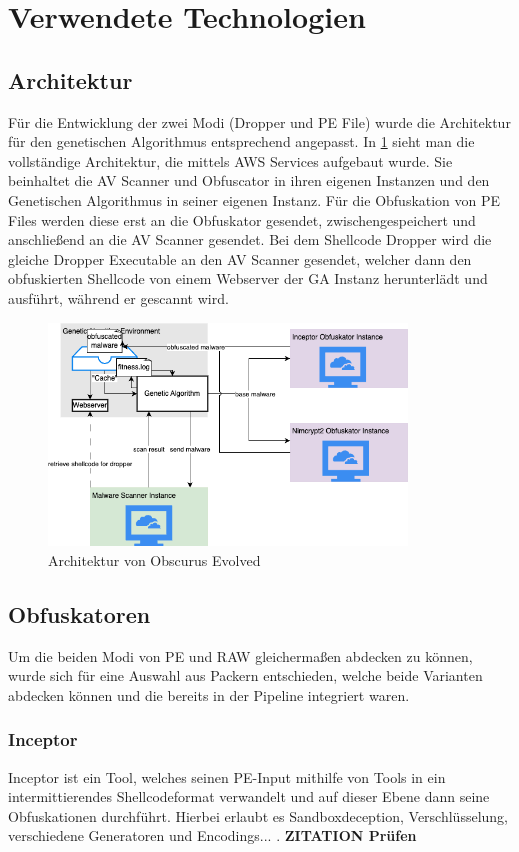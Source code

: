 \section{Verwendete Technologien}
\label{Sec:Technologie}
\subsection{Architektur}
Für die Entwicklung der zwei Modi (Dropper und PE File) wurde die Architektur für den genetischen Algorithmus entsprechend angepasst. In \ref{fig:architecture} sieht man die vollständige Architektur, die mittels AWS Services aufgebaut wurde. Sie beinhaltet die AV Scanner und Obfuscator in ihren eigenen Instanzen und den Genetischen Algorithmus in seiner eigenen Instanz. Für die Obfuskation von PE Files werden diese erst an die Obfuskator gesendet, zwischengespeichert und anschließend an die AV Scanner gesendet. Bei dem Shellcode Dropper wird die gleiche Dropper Executable an den AV Scanner gesendet, welcher dann den obfuskierten Shellcode von einem Webserver der GA Instanz herunterlädt und ausführt, während er gescannt wird.
\begin{figure}[h]
    \centering
    \includegraphics[width=0.85\textwidth]{gfx/Abbildungen/Architektur.drawio.png}
    \caption{Architektur von Obscurus Evolved}
    \label{fig:architecture}
\end{figure}

\subsection{Obfuskatoren}
Um die beiden Modi von PE und RAW gleichermaßen abdecken zu können, wurde sich für eine Auswahl aus Packern entschieden, welche beide Varianten abdecken können und die bereits in der Pipeline integriert waren.
    \subsubsection{Inceptor}
    Inceptor ist ein Tool, welches seinen PE-Input mithilfe von Tools in ein intermittierendes Shellcodeformat verwandelt und auf dieser Ebene dann seine Obfuskationen durchführt. Hierbei erlaubt es Sandboxdeception, Verschlüsselung, verschiedene Generatoren und Encodings...
    \cite{wauters_2024_building}.
    \cite{klezVirus_n.d.} 
    \textbf{ZITATION Prüfen}
